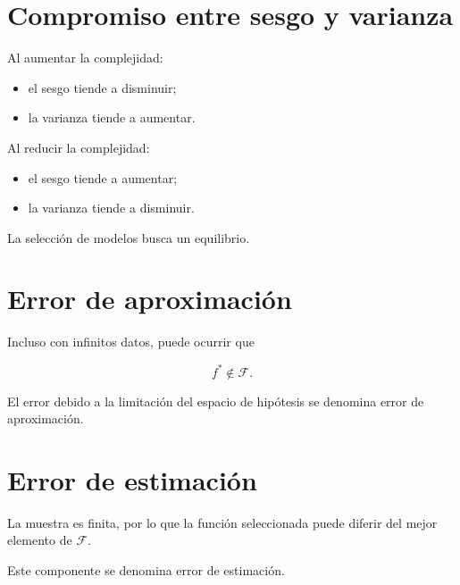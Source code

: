 \documentclass[
  spanish,
  10.5pt,
  letterpaper,
  DIV=11,
  numbers=noendperiod,
  oneside,
  open=any]{scrreprt}
\providecommand{\tightlist}{%
  \setlength{\itemsep}{0pt}\setlength{\parskip}{0pt}}
\theoremstyle{definition}
\theoremstyle{definition}
\theoremstyle{plain}
\theoremstyle{remark}
\begin{document}
\section*{Compromiso entre sesgo y
varianza}\label{compromiso-entre-sesgo-y-varianza}


Al aumentar la complejidad:

\begin{itemize}
\tightlist
\item
  el sesgo tiende a disminuir;
\item
  la varianza tiende a aumentar.
\end{itemize}

Al reducir la complejidad:

\begin{itemize}
\tightlist
\item
  el sesgo tiende a aumentar;
\item
  la varianza tiende a disminuir.
\end{itemize}

La selección de modelos busca un equilibrio.

\section*{Error de aproximación}\label{error-de-aproximaciuxf3n}


Incluso con infinitos datos, puede ocurrir que

\[
f^{*}\notin\mathcal{F}.
\]

El error debido a la limitación del espacio de hipótesis se denomina
error de aproximación.

\section*{Error de estimación}\label{error-de-estimaciuxf3n}


La muestra es finita, por lo que la función seleccionada puede diferir
del mejor elemento de \(\mathcal{F}\).

Este componente se denomina error de estimación.
\end{document}

